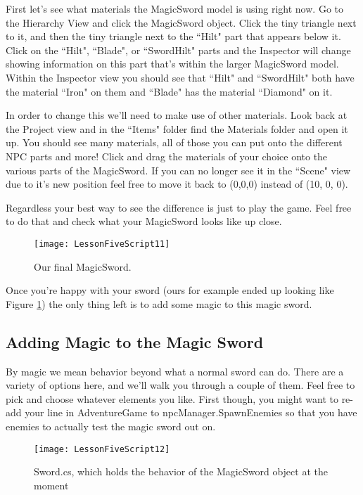 \documentclass{article}
\begin{document}
First let's see what materials the MagicSword model is using right now. Go to the Hierarchy View and click the MagicSword object. Click the tiny triangle next to it, and then the tiny triangle next to the ``Hilt" part that appears below it. Click on the ``Hilt", ``Blade", or ``SwordHilt" parts and the Inspector will change showing information on this part that's within the larger MagicSword model. Within the Inspector view you should see that ``Hilt" and ``SwordHilt" both have the material ``Iron" on them and ``Blade" has the material ``Diamond" on it.

In order to change this we'll need to make use of other materials. Look back at the Project view and in the ``Items" folder find the Materials folder and open it up. You should see many materials, all of those you can put onto the different NPC parts and more! Click and drag the materials of your choice onto the various parts of the MagicSword. If you can no longer see it in the ``Scene" view due to it's new position feel free to move it back to (0,0,0) instead of (10, 0, 0).

Regardless your best way to see the difference is just to play the game. Feel free to do that and check what your MagicSword looks like up close. 

\begin{figure}
  \texttt{[image: LessonFiveScript11]}
  \caption{Our final MagicSword.}
  \label{fig:LessonFiveScript11}
\end{figure}

Once you're happy with your sword (ours for example ended up looking like Figure \ref{fig:LessonFiveScript11}) the only thing left is to add some magic to this magic sword. 

\subsection{Adding Magic to the Magic Sword}

By magic we mean behavior beyond what a normal sword can do. There are a variety of options here, and we'll walk you through a couple of them. Feel free to pick and choose whatever elements you like. First though, you might want to re-add your line in AdventureGame to npcManager.SpawnEnemies so that you have enemies to actually test the magic sword out on.

\begin{figure}
  \texttt{[image: LessonFiveScript12]}
  \caption{Sword.cs, which holds the behavior of the MagicSword object at the moment}
  \label{fig:LessonFiveScript12}
\end{figure}
\end{document}
